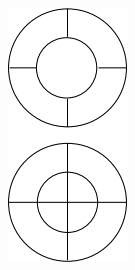 \begin{figure}
    \includegraphics[width=\textwidth]{images/r-hog}
    \caption[R-HOG samples]{}
    \label{fig:r-hog}
\end{figure}

